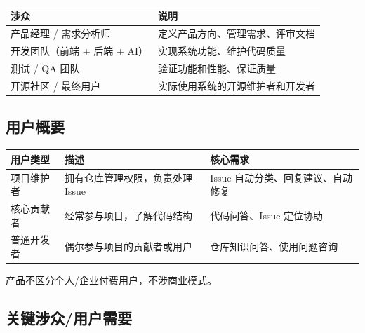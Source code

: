 \documentclass[10pt,a4paper]{article}
\newenvironment{ieeetable}{\begin{center}}{\end{center}}
\begin{document}
\begin{ieeetable}
    \begin{tabularx}{\textwidth}{L{4cm} X}
        \toprule
        \textbf{涉众} & \textbf{说明} \\
        \midrule
        产品经理 / 需求分析师 & 定义产品方向、管理需求、评审文档 \\
        \midrule
        开发团队（前端 + 后端 + AI） & 实现系统功能、维护代码质量 \\
        \midrule
        测试 / QA 团队 & 验证功能和性能、保证质量 \\
        \midrule
        开源社区 / 最终用户 & 实际使用系统的开源维护者和开发者 \\
        \bottomrule
    \end{tabularx}
\end{ieeetable}

\subsection{用户概要}

\begin{ieeetable}
    \begin{tabularx}{\textwidth}{L{3.5cm} L{4.5cm} X}
        \toprule
        \textbf{用户类型} & \textbf{描述} & \textbf{核心需求} \\
        \midrule
        项目维护者 & 拥有仓库管理权限，负责处理 Issue & Issue 自动分类、回复建议、自动修复 \\
        \midrule
        核心贡献者 & 经常参与项目，了解代码结构 & 代码问答、Issue 定位协助 \\
        \midrule
        普通开发者 & 偶尔参与项目的贡献者或用户 & 仓库知识问答、使用问题咨询 \\
        \bottomrule
    \end{tabularx}
\end{ieeetable}

产品不区分个人/企业付费用户，不涉商业模式。

\subsection{关键涉众/用户需要}
\end{document}
